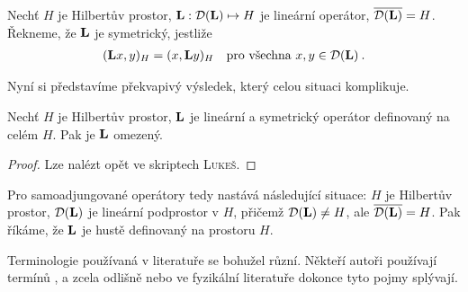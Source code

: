 \begin{definition}
Nechť $H$ je Hilbertův prostor, $\mathbf{L} : \mathcal{D}(\mathbf{L}) \mapsto H$ je lineární operátor, $\overline{\mathcal{D}(\mathbf{L})} = H $. Řekneme, že $\mathbf{L}$ je symetrický, jestliže \begin{align*}
    (\mathbf{L} x, y)_H = (x, \mathbf{L} y)_H \quad \text{pro všechna } x,y \in \mathcal{D}(\mathbf{L}) \:.
\end{align*}
\end{definition}

Nyní si představíme překvapivý výsledek, který celou situaci komplikuje.

\begin{theorem}
Nechť $H$ je Hilbertův prostor, $\mathbf{L}$ je lineární a symetrický operátor definovaný na celém $H$. Pak je $\mathbf{L}$ omezený.
\end{theorem}
\begin{proof}
Lze nalézt opět ve skriptech \textsc{Lukeš}.
\end{proof}

Pro samoadjungované operátory tedy nastává následující situace: $H$ je Hilbertův prostor, $\mathcal{D}(\mathbf{L})$ je lineární podprostor v $H$, přičemž  $\mathcal{D}(\mathbf{L}) \neq H$, ale $\overline{\mathcal{D}(\mathbf{L})} = H$. Pak říkáme, že $\mathbf{L}$ je hustě definovaný na prostoru $H$.

Terminologie používaná v literatuře se bohužel různí. Někteří autoři používají termínů , a  zcela odlišně nebo ve fyzikální literatuře dokonce tyto pojmy splývají. 

